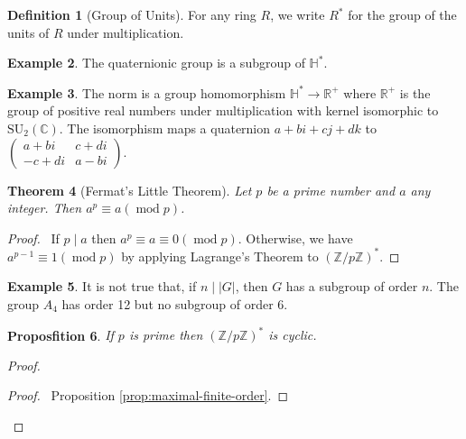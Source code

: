 \documentclass{book}
\let\qed\relax
\newtheorem{prop}{Proposfition}[chapter]
\newtheorem{thm}[prop]{Theorem}
\theoremstyle{definition}
\newtheorem{df}[prop]{Definition}
\newtheorem{ex}[prop]{Example}
\renewcommand{\mod}{\ensuremath{\operatorname{mod}}}
\begin{document}
\begin{df}[Group of Units]
For any ring $R$, we write $R^*$ for the group of the units of $R$ under multiplication.
\end{df}

\begin{ex}
The quaternionic group is a subgroup of $\mathbb{H}^*$.
\end{ex}

\begin{ex}
The norm is a group homomorphism $\mathbb{H}^* \rightarrow \mathbb{R}^+$ where $\mathbb{R}^+$ is the group of positive real numbers under multiplication with kernel isomorphic to $\mathrm{SU}_2(\mathbb{C})$. The isomorphism maps a quaternion $a + bi + cj + dk$ to $\left( \begin{array}{cc}
a + bi & c + di \\ -c + di & a - bi
\end{array} \right)$.
\end{ex}

\begin{thm}[Fermat's Little Theorem]
Let $p$ be a prime number and $a$ any integer. Then $a^p \equiv a (\mod p)$.
\end{thm}

\begin{proof}
\pf\ If $p \mid a$ then $a^p \equiv a \equiv 0 (\mod p)$. Otherwise, we have $a^{p-1} \equiv 1 (\mod p)$ by applying Lagrange's Theorem to $(\mathbb{Z} / p \mathbb{Z})^*$. \qed
\end{proof}

\begin{ex}
It is not true that, if $n \mid |G|$, then $G$ has a subgroup of order $n$. The group $A_4$ has order 12 but no subgroup of order 6.
\end{ex}

\begin{prop}
    If $p$ is prime then $(\mathbb{Z} / p \mathbb{Z})^*$ is cyclic.
\end{prop}

\begin{proof}
    \pf
    \begin{proof}
        \pf\ Proposition \ref{prop:maximal-finite-order}.
    \end{proof}
    \qed
\end{proof}
\end{document}
